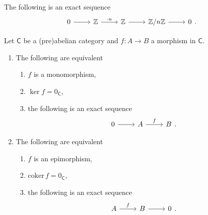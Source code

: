 \documentclass[../Main]{subfiles}
\begin{document}
\begin{ex}
	The following is an exact sequence
	\begin{equation}
	\begin{tikzcd}
		0 \arrow[r, "", rightarrow] &
		\mathbb{Z} \arrow[r, "\cdot n", rightarrow] &
		\mathbb{Z} \arrow[r, "", rightarrow] &
		\mathbb{Z}/n\mathbb{Z} \arrow[r, "", rightarrow] &
		0
	\end{tikzcd}
	.\end{equation} 
\end{ex} 

\begin{exr}
	Let $\mathsf{C}$ be a (pre)abelian category and
	$f\colon A \to B$ a morphism in $\mathsf{C}$.
	\begin{enumerate}
		\item The following are equivalent
			\begin{enumerate}
				\item $f$ is a monomorphism,
				\item $\ker f = 0_{\mathsf{C}}$,
				\item the following is an exact sequence
					\begin{equation}
					\begin{tikzcd}
						0 \arrow[r, "", rightarrow] &
						A \arrow[r, "f", rightarrow] &
						B
					\end{tikzcd}
					.\end{equation} 
			\end{enumerate}
		\item The following are equivalent
			\begin{enumerate}
				\item $f$ is an epimorphism,
				\item $\mathrm{coker}\, f = 0_{\mathsf{C}}$,
				\item the following is an exact sequence
					\begin{equation}
					\begin{tikzcd}
						A \arrow[r, "f", rightarrow] &
						B \arrow[r, "", rightarrow] &
						0
					\end{tikzcd}
					.\end{equation} 
			\end{enumerate}
	\end{enumerate}
\end{exr} 
\end{document}
